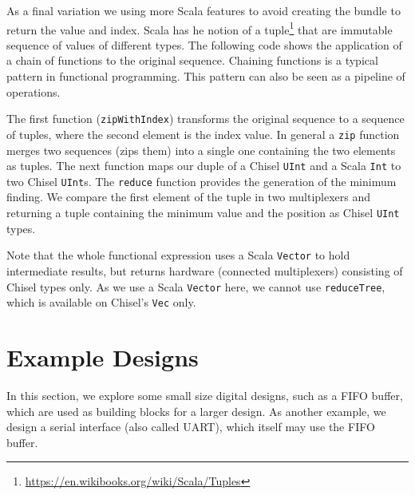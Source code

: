 \documentclass[%
    10pt,
    headinclude, footexclude,
    openright, %
    notitlepage,
    cleardoubleempty,
    headsepline,
    pointlessnumbers,
    bibtotoc, idxtotoc,
    ]{scrbook}
\newcommand{\code}[1]{{\small{\texttt{#1}}}}
\newcommand{\todo}[1]{{\emph{TODO: #1}}}
\newcommand{\myref}[2]{\href{#1}{#2}}
\renewcommand{\myref}[2]{{#2}{\footnote{\url{#1}}}}
\renewcommand{\todo}[1]{}
\begin{document}
As a final variation we using more Scala features to avoid creating the bundle to return the value
and index. Scala has he notion of a \myref{https://en.wikibooks.org/wiki/Scala/Tuples}{tuple}
that are immutable sequence of values of different types. The following code shows the application
of a chain of functions to the original sequence. Chaining functions is a typical pattern in functional programming.
This pattern can also be seen as a pipeline of operations.

The first function (\code{zipWithIndex})
transforms the original sequence to a sequence of tuples, where the second element is the index
value. In general a \code{zip} function merges two sequences (zips them) into a single one
containing the two elements as tuples. The next function maps our duple of a Chisel \code{UInt}
and a Scala \code{Int} to two Chisel \code{UInt}s. The \code{reduce} function provides the generation of
the minimum finding. We compare the first element of the tuple in two multiplexers and returning
a tuple containing the minimum value and the position as Chisel \code{UInt} types.


Note that the whole functional expression uses a Scala \code{Vector} to hold intermediate results,
but returns hardware (connected multiplexers) consisting of Chisel types only.
As we use a Scala \code{Vector} here, we cannot use \code{reduceTree}, which is available on Chisel's
\code{Vec} only.

\todo{Explain the following code}





\todo{explain the function, talk about reduceTree}

\chapter{Example Designs}

In this section, we explore some small size digital designs, such as
a FIFO buffer, which are used as building blocks for a larger design.
As another example, we design a serial interface (also called UART),
which itself may use the FIFO buffer.
\end{document}
